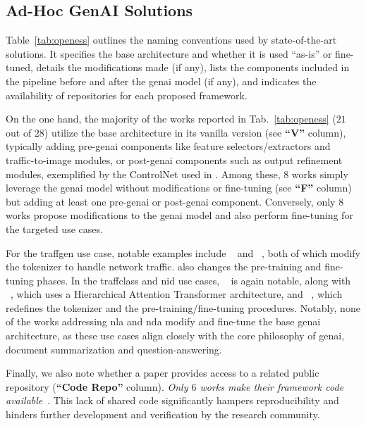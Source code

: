 \subsection{
Ad-Hoc GenAI Solutions\label{subsec:adhoc_genai_solutions}
}



Table~\ref{tab:openess} outlines the naming conventions used by state-of-the-art solutions.
It specifies the base architecture and whether it is used ``as-is'' or fine-tuned, details the modifications made (if any), lists the components included in the pipeline before and after the \gls{genai} model (if any), and indicates the availability of repositories for each proposed framework.





On the one hand, the majority of the works reported in Tab.~\ref{tab:openess} ($21$ out of $28$) utilize the base architecture in its vanilla version (see \textbf{``V''} column), typically adding pre-\gls{genai} components like feature selectors/extractors and traffic-to-image modules, or post-\gls{genai} components such as output refinement modules, exemplified by the ControlNet used in .
Among these, $8$ works simply leverage the \gls{genai} model without modifications or fine-tuning (see \textbf{``F''} column) but adding at least one pre-\gls{genai} or post-\gls{genai} component.
Conversely, only $8$ works propose modifications to the \gls{genai} model and also perform fine-tuning for the targeted use cases.


For the \gls{traffgen} use case, notable examples include ~\cite{qu2024trafficgpt} and ~\cite{wang2024lens}, both of which modify the tokenizer to handle network traffic.  also changes the pre-training and fine-tuning phases.
In the \gls{traffclass} and \gls{nid} use cases,  ~\cite{wang2024lens} is again notable, along with ~\cite{guthula2023netfound}, which uses a Hierarchical Attention Transformer architecture, and ~\cite{lin2022}, which redefines the tokenizer and the pre-training/fine-tuning procedures.
Notably, none of the works addressing \gls{nla} and \gls{nda} modify and fine-tune the base \gls{genai} architecture, as these use cases align closely with the core philosophy of \gls{genai}, \eg document summarization and question-answering.


Finally, we also note whether a paper provides access to a related public repository 
(\textbf{``Code Repo''} column). 
\textit{Only $6$ works make their framework code available}~\cite{lin2022, han2023loggpt, wang2024netmamba, liu2024large, manocchio2024flowtransformer, jiang2024netdiffusion}.
This lack of shared code significantly hampers reproducibility and hinders further development and verification by the research community.